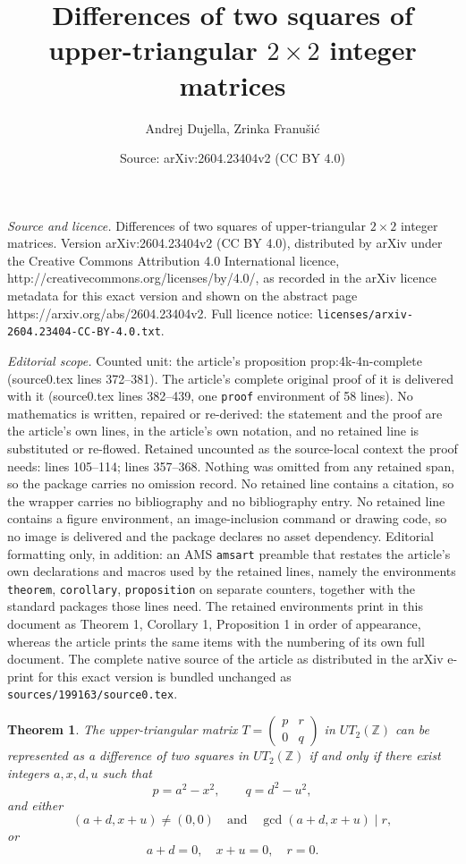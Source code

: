 \documentclass[10pt,a4paper]{amsart}
\title{Differences of two squares of upper-triangular $2\times 2$ integer matrices}
\author{Andrej Dujella, Zrinka Franu\v{s}i\'c}
\date{Source: arXiv:2604.23404v2 (CC BY 4.0)}
\newtheorem{theorem}{Theorem}
\def\Z{\mathbb{Z}}
\begin{document}
\maketitle

\noindent\emph{Source and licence.} Differences of two squares of upper-triangular $2\times 2$ integer matrices. Version arXiv:2604.23404v2 (CC BY 4.0), distributed by arXiv under the Creative Commons Attribution 4.0 International licence, http://creativecommons.org/licenses/by/4.0/, as recorded in the arXiv licence metadata for this exact version and shown on the abstract page https://arxiv.org/abs/2604.23404v2. Full licence notice: \texttt{licenses/arxiv-2604.23404-CC-BY-4.0.txt}.\par\smallskip

\noindent\textit{Editorial scope.} Counted unit: the article's proposition prop:4k-4n-complete (source0.tex lines 372--381). The article's complete original proof of it is delivered with it (source0.tex lines 382--439, one \texttt{proof} environment of 58 lines). No mathematics is written, repaired or re-derived: the statement and the proof are the article's own lines, in the article's own notation, and no retained line is substituted or re-flowed.  Retained uncounted as the source-local context the proof needs: lines 105--114; lines 357--368.  Nothing was omitted from any retained span, so the package carries no omission record.  No retained line contains a citation, so the wrapper carries no bibliography and no bibliography entry.  No retained line contains a figure environment, an image-inclusion command or drawing code, so no image is delivered and the package declares no asset dependency.  Editorial formatting only, in addition: an AMS \texttt{amsart} preamble that restates the article's own declarations and macros used by the retained lines, namely the environments \texttt{theorem}, \texttt{corollary}, \texttt{proposition} on separate counters, together with the standard packages those lines need.  The retained environments print in this document as Theorem 1, Corollary 1, Proposition 1 in order of appearance, whereas the article prints the same items with the numbering of its own full document.  The complete native source of the article as distributed in the arXiv e-print for this exact version is bundled unchanged as \texttt{sources/199163/source0.tex}.
\begin{theorem}\label{thm:main-criterion}
The upper-triangular matrix
$T=\begin{pmatrix}p&r\\0&q\end{pmatrix}$ in $UT_2(\Z)$
can be represented as a difference of two squares in $UT_2(\Z)$  if and only if there exist integers $a,x,d,u$ such that
$$p=a^2-x^2,\qquad q=d^2-u^2,$$
and either
$$(a+d,x+u)\neq(0,0)\quad\text{and}\quad \gcd(a+d,x+u)\mid r,$$
or
$$a+d=0,\quad x+u=0,\quad r=0.$$
\end{theorem}
\end{document}

